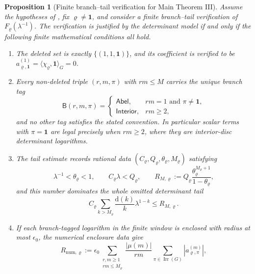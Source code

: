 \documentclass[11pt,a4paper]{amsart}
\theoremstyle{plain}
\newtheorem{proposition}[theorem]{Proposition}
\theoremstyle{definition}
\theoremstyle{remark}
\DeclareMathOperator{\Irr}{Irr}
\begin{document}
\begin{proposition}[Finite branch--tail verification for Main Theorem III]
  \label{prop:fixed-label-branch-tail-record}
  \label{cor:main-iii-boundary-determinant-convention}
  \label{thm:fixed-label-certificate-compression}
  \label{cor:fixed-label-product-rational-enclosures}
  Assume the hypotheses of , fix
  \(\varrho\ne\mathbf1\), and consider a finite branch--tail verification of
  \(F_\varrho(\lambda^{-1})\).  The verification is justified by the determinant
  model if and only if the following finite mathematical conditions all hold.
  \begin{enumerate}[label=\textup{(\roman*)},leftmargin=*]
    \item The deleted set is exactly \(\{(1,1,\mathbf1)\}\), and its coefficient
      is verified to be
      \(a_{\varrho,\mathbf1}^{(1)}=\langle\chi_\varrho,\mathbf1\rangle_G=0\).
    \item Every non-deleted triple \((r,m,\pi)\) with \(rm\le M\) carries the
      unique branch tag
      \[
        \mathsf B(r,m,\pi)=
        \begin{cases}
          \mathsf{Abel},& rm=1\text{ and }\pi\ne\mathbf1,\\
          \mathsf{Interior},& rm\ge2,
        \end{cases}
      \]
      and no other tag satisfies the stated convention.  In particular scalar terms with
      \(\pi=\mathbf1\) are legal precisely when \(rm\ge2\), where they are
      interior-disc determinant logarithms.
    \item The tail estimate records rational data
      \((C_\varrho,Q_\varrho,\theta_\varrho,M_\varrho)\) satisfying
      \[
        \lambda^{-1}<\theta_\varrho<1,
        \qquad C_\varrho\lambda<Q_\varrho,
        \qquad
        R_{M,\varrho}:=
        Q_\varrho\frac{\theta_\varrho^{M_\varrho+1}}{1-\theta_\varrho},
      \]
      and this number dominates the whole omitted determinant tail
      \[
        C_\varrho
        \sum_{k>M_\varrho}\frac{\mathrm d(k)}{k}\lambda^{1-k}
        \le R_{M,\varrho}.
      \]
    \item If each branch-tagged logarithm in the finite window is enclosed
      with radius at most \(\epsilon_0\), the numerical enclosure data give
      \[
        R_{\mathrm{num},\varrho}:=
        \epsilon_0
        \sum_{\substack{r,m\ge1\\rm\le M_\varrho}}
          \frac{|\mu(m)|}{rm}
          \sum_{\pi\in\Irr(G)}|a_{\varrho,\pi}^{(m)}|,
      \]

\end{enumerate}
\end{proposition}
\end{document}
